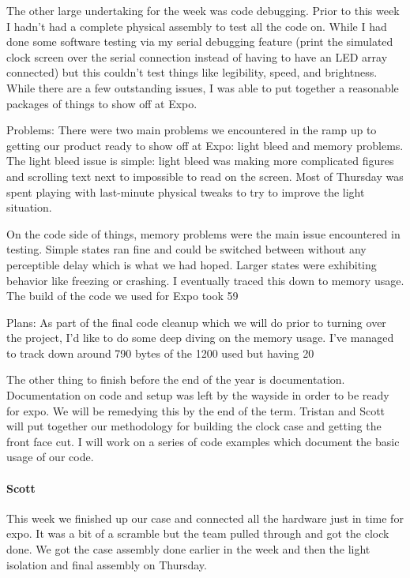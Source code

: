 \documentclass[onecolumn, draftclsnofoot,10pt, compsoc]{IEEEtran}
\begin{document}
The other large undertaking for the week was code debugging. Prior to this week I hadn't had a complete physical assembly to test all the code on. While I had done some software testing via my serial debugging feature (print the simulated clock screen over the serial connection instead of having to have an LED array connected) but this couldn't test things like legibility, speed, and brightness. While there are a few outstanding issues, I was able to put together a reasonable packages of things to show off at Expo.

Problems: There were two main problems we encountered in the ramp up to getting our product ready to show off at Expo: light bleed and memory problems. The light bleed issue is simple: light bleed was making more complicated figures and scrolling text next to impossible to read on the screen. Most of Thursday was spent playing with last-minute physical tweaks to try to improve the light situation.

On the code side of things, memory problems were the main issue encountered in testing. Simple states ran fine and could be switched between without any perceptible delay which is what we had hoped. Larger states were exhibiting behavior like freezing or crashing. I eventually traced this down to memory usage. The build of the code we used for Expo took 59%

Plans: As part of the final code cleanup which we will do prior to turning over the project, I'd like to do some deep diving on the memory usage. I've managed to track down around 790 bytes of the 1200 used but having 20%

The other thing to finish before the end of the year is documentation. Documentation on code and setup was left by the wayside in order to be ready for expo. We will be remedying this by the end of the term. Tristan and Scott will put together our methodology for building the clock case and getting the front face cut. I will work on a series of code examples which document the basic usage of our code.
\paragraph{Scott}
This week we finished up our case and connected all the hardware just in time for expo. It was a bit of a scramble but the team pulled through and got the clock done. We got the case assembly done earlier in the week and then the light isolation and final assembly on Thursday.
\end{document}
